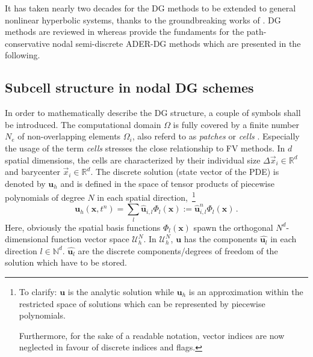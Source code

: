 It has taken nearly two decades for the DG methods to be
extended to general nonlinear hyperbolic systems, thanks to the
groundbreaking works of \cite{Cockburn1989b,Cockburn1990,CockburnShu98}.
DG methods are reviewed in 
\cite{cockburn_2000_dg,cockburn_2001_rkd,Shu2016,hesthaven2007,hesthaven2008,Cockburn2003}
whereas \cite{ADERNSE,Dumbser2009,Dumbser2010b} provide the fundaments
for the path-conservative nodal semi-discrete ADER-DG methods which are
presented in the following.
%

\subsection{Subcell structure in nodal DG schemes}\label{sec:dg-subcell-structure}
In order to mathematically describe the DG structure, a couple of symbols
shall be introduced. The
computational domain $\Omega$ is fully covered by a finite number $N_e$ of 
non-overlapping elements $\Omega_i$, also referd to as \emph{patches} or 
\emph{cells}  \cite{Khokhlov98}. Especially
the usage of the term \emph{cells} stresses the close relationship to FV 
methods. 
In $d$ spatial dimensions, the cells are characterized by their individual size
$\Delta \vec x_i \in \mathbb R^d$
and barycenter $\vec x_i \in \mathbb R^d$.
%
The discrete solution (state vector of the PDE) is denoted by
$\boldsymbol{u}_h$ and is defined in the space of tensor products
of piecewise polynomials of degree $N$ in each spatial direction,~\footnote{
 	To clarify:
 	$\boldsymbol u$ is the analytic solution while $\boldsymbol u_h$ is
 	an approximation within the restricted space of solutions which
 	can be represented by piecewise polynomials.
 	
 	Furthermore, for the sake of a readable notation, vector indices are
 	now neglected in favour of discrete indices and flags.
 } 
\begin{equation}
\boldsymbol{u}_h(\boldsymbol{x},t^n) = \sum \limits_l \hat{\boldsymbol{u}}_{i,l}
\Phi_l(\boldsymbol{x}) := \hat{\boldsymbol{u}}_{i,l}^n \Phi_l(\boldsymbol{x})\,.
\label{eqn.ansatz.uh}
\end{equation}
Here, obviously the spatial basis functions
$\Phi_l(\boldsymbol{x})$ spawn the
orthogonal $N^d$-dimensional function vector space $\mathcal{U}_h^N$. In 
$\mathcal{U}_h^N$,
$\boldsymbol u$ has the components $\hat{\boldsymbol u_l}$ in each direction
$l\in \mathbb N^d$. $\hat{\boldsymbol u_l}$ are the discrete components/degrees
of freedom of the solution which have to be stored.

